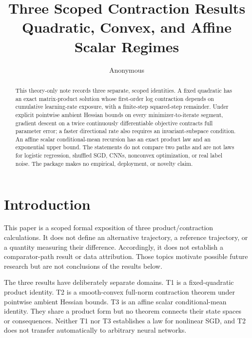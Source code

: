 \documentclass{article}
\title{Three Scoped Contraction Results\\
Quadratic, Convex, and Affine Scalar Regimes}
\author{Anonymous}
\begin{document}
\maketitle

\begin{abstract}
This theory-only note records three separate, scoped identities. A fixed
quadratic has an exact matrix-product solution whose first-order log
contraction depends on cumulative learning-rate exposure, with a finite-step
squared-step remainder. Under explicit pointwise ambient Hessian bounds on
every minimizer-to-iterate segment, gradient descent on a twice continuously
differentiable objective contracts full parameter error; a faster directional
rate also requires an invariant-subspace condition. An affine scalar
conditional-mean recursion has an exact product law and an exponential upper
bound. The statements do not compare two paths and are not laws for logistic
regression, shuffled SGD, CNNs, nonconvex optimization, or real label noise.
The package makes no empirical, deployment, or novelty claim.
\end{abstract}

\section{Introduction}
\label{sec:intro}

This paper is a scoped formal exposition of three product/contraction
calculations. It does not define an alternative trajectory, a reference
trajectory, or a quantity measuring their difference. Accordingly, it does
not establish a comparator-path result or data attribution. Those topics
motivate possible future research but are not conclusions of the results below.

The three results have deliberately separate domains. T1 is a fixed-quadratic
product identity. T2 is a smooth-convex full-norm contraction theorem under
pointwise ambient Hessian bounds. T3 is an affine scalar conditional-mean
identity. They share a product form but no theorem connects their state spaces
or consequences. Neither T1 nor T3 establishes a law for nonlinear SGD, and
T2 does not transfer automatically to arbitrary neural networks.
\end{document}
